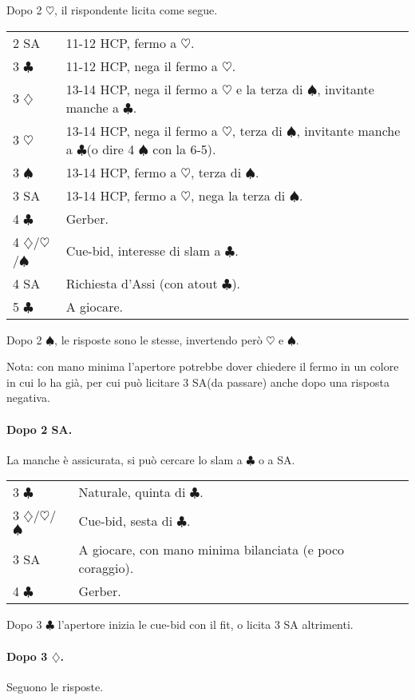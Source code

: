 \documentclass[a4paper,10pt]{article}
\renewcommand{\c}{$\clubsuit$\xspace}
\renewcommand{\d}{$\diamondsuit$\xspace}
\newcommand{\h}{$\heartsuit$\xspace}
\newcommand{\s}{$\spadesuit$\xspace}
\newcommand{\sa}{SA\xspace}
\newcommand{\smallspace}{\vskip0.3cm}
\newenvironment{twocol}
  {\smallspace\noindent\begin{tabular}{l p{0.78\textwidth}}}
  {\end{tabular}\smallspace}
\begin{document}
Dopo 2 \h, il rispondente licita come segue.

\begin{twocol}
	2 \sa & 11-12 HCP, fermo a \h. \\
	3 \c & 11-12 HCP, nega il fermo a \h. \\
	3 \d & 13-14 HCP, nega il fermo a \h e la terza di \s, invitante manche a \c. \\
	3 \h & 13-14 HCP, nega il fermo a \h, terza di \s, invitante manche a \c (o dire 4 \s con la 6-5). \\
	3 \s & 13-14 HCP, fermo a \h, terza di \s. \\
	3 \sa & 13-14 HCP, fermo a \h, nega la terza di \s. \\
	4 \c & Gerber. \\
	4 \d/\h/\s & Cue-bid, interesse di slam a \c. \\
	4 \sa & Richiesta d'Assi (con atout \c). \\
	5 \c & A giocare. \\
\end{twocol}

Dopo 2 \s, le risposte sono le stesse, invertendo però \h e \s.

Nota: con mano minima l'apertore potrebbe dover chiedere il fermo in un colore in cui lo ha già, per cui può licitare 3 \sa (da passare) anche dopo una risposta negativa.

\paragraph{Dopo 2 \sa.} La manche è assicurata, si può cercare lo slam a \c o a \sa.

\begin{twocol}
	3 \c & Naturale, quinta di \c. \\
	3 \d/\h/\s & Cue-bid, sesta di \c. \\
	3 \sa & A giocare, con mano minima bilanciata (e poco coraggio). \\
	4 \c & Gerber.
\end{twocol}

Dopo 3 \c l'apertore inizia le cue-bid con il fit, o licita 3 \sa altrimenti. %

\paragraph{Dopo 3 \d.} Seguono le risposte.
\end{document}
